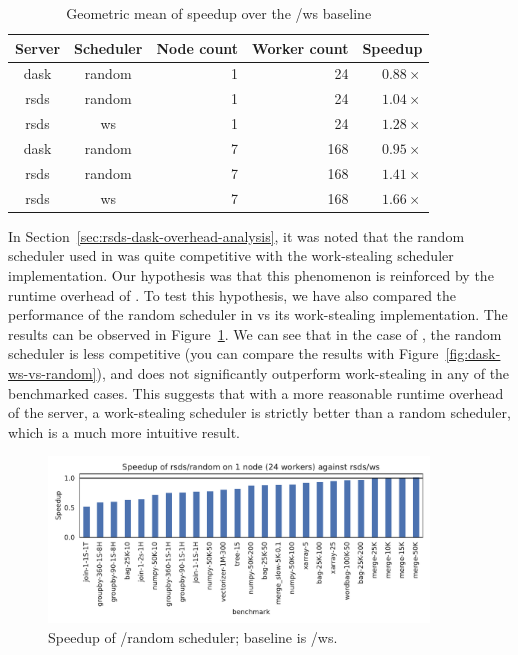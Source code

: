 \setlength{\tabcolsep}{5pt}
\begin{table}
	\caption{Geometric mean of speedup over the \dask{}/ws baseline}
	\centering
	\label{tab:rsds-geom-mean-speedup}
	\begin{tabular}{c|c|r|r|r}
		\textbf{Server} & \textbf{Scheduler} & \textbf{Node count} & \textbf{Worker	count} &
		\textbf{Speedup}                                                                                 \\
		\midrule
		dask            & random             & 1                   & 24                   & $0.88\times$ \\
		rsds            & random             & 1                   & 24                   & $1.04\times$ \\
		rsds            & ws                 & 1                   & 24                   & $1.28\times$ \\
		dask            & random             & 7                   & 168                  & $0.95\times$ \\
		rsds            & random             & 7                   & 168                  & $1.41\times$ \\
		rsds            & ws                 & 7                   & 168                  & $1.66\times$ \\
	\end{tabular}
\end{table}

In Section~\ref{sec:rsds-dask-overhead-analysis}, it was noted that the random scheduler used in
\dask{} was quite competitive with the work-stealing scheduler implementation.
Our hypothesis was that this phenomenon is reinforced by the runtime overhead of
\dask{}. To test this hypothesis, we have also compared the performance of the
random scheduler in \rsds{} vs its work-stealing implementation. The results
can be observed in Figure~\ref{fig:rsds-random-baseline}. We can see that in the case of
\rsds{}, the random scheduler is less competitive (you can compare the results
with Figure~\ref{fig:dask-ws-vs-random}), and does not significantly outperform work-stealing in
any of the benchmarked cases. This suggests that with a more reasonable runtime overhead of the
server, a work-stealing scheduler is strictly better than a random scheduler, which is a much more
intuitive result.

\begin{figure}
	\centering
	\includegraphics[width=0.9\textwidth]{./imgs/rsds/charts/speedup-rsds-random-1-baseline-rsds-ws}
	\caption{Speedup of \rsds{}/random scheduler; baseline is \rsds{}/ws.}
	\label{fig:rsds-random-baseline}
\end{figure}

